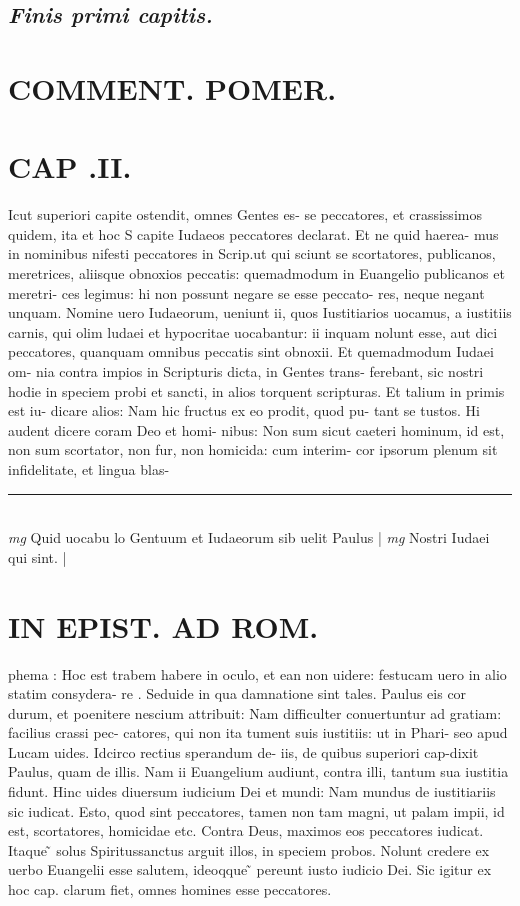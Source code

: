 \documentclass{article}
\begin{document}
\begin{pages}
\subsection*{\textit{Finis primi capitis.  }}
\section*{COMMENT. POMER.  }
\section*{CAP .II. }\pstart Icut superiori capite ostendit, omnes Gentes es- se peccatores, et crassissimos quidem, ita et hoc S capite Iudaeos peccatores declarat. Et ne quid haerea- mus in nominibus     nifesti peccatores in Scrip.ut qui sciunt se scortatores, publicanos, meretrices, aliisque obnoxios peccatis: quemadmodum in Euangelio publicanos et meretri- ces legimus: hi non possunt negare se esse peccato- res, neque negant unquam. Nomine uero Iudaeorum, ueniunt ii, quos Iustitiarios uocamus, a iustitiis carnis, qui olim ludaei et hypocritae uocabantur: ii inquam nolunt esse, aut dici peccatores, quanquam omnibus peccatis sint obnoxii. Et quemadmodum Iudaei om- nia contra impios in Scripturis dicta, in Gentes trans- ferebant, sic nostri hodie in speciem probi et sancti, in alios torquent scripturas. Et talium in primis est iu- dicare alios: Nam hic fructus ex eo prodit, quod pu- tant se tustos. Hi audent dicere coram Deo et homi- nibus: Non sum sicut caeteri hominum, id est, non sum scortator, non fur, non homicida: cum interim- cor ipsorum plenum sit infidelitate, et lingua blas-  \pend\pstart  \pend
\vspace{0.5cm}\noindent
\vspace{0.2cm}\rule{1cm}{0.2pt}\\ 
\hspace{0.2cm}\textit{mg}
\footnotesize Quid uocabu lo Gentuum et Iudaeorum sib uelit Paulus 
\normalsize| 
\hspace{0.2cm}\textit{mg}
\footnotesize Nostri Iudaei qui sint.  
\normalsize| 
\section*{IN EPIST. AD ROM.  }
\marginpar{[ p.13 ]}\pstart phema : Hoc est trabem habere in oculo, et ean non uidere: festucam uero in alio statim consydera- re . Seduide in qua damnatione sint tales. Paulus eis cor durum, et poenitere nescium attribuit: Nam difficulter conuertuntur ad gratiam: facilius crassi pec- catores, qui non ita tument suis iustitiis: ut in Phari- seo apud Lucam uides. Idcirco rectius sperandum de- iis, de quibus superiori cap-dixit Paulus, quam de illis. Nam ii Euangelium audiunt, contra illi, tantum sua iustitia fidunt. Hinc uides diuersum iudicium Dei et mundi: Nam mundus de iustitiariis sic iudicat.  Esto, quod sint peccatores, tamen non tam magni, ut palam impii, id est, scortatores, homicidae etc. Contra Deus, maximos eos peccatores iudicat. Itaque ̃ solus Spiritussanctus arguit illos, in speciem probos. Nolunt credere ex uerbo Euangelii esse salutem, ideoqque ̃ pereunt iusto iudicio Dei. Sic igitur ex hoc cap. clarum fiet, omnes homines esse peccatores.   \pend
{}
{}

\end{pages}
\end{document}
